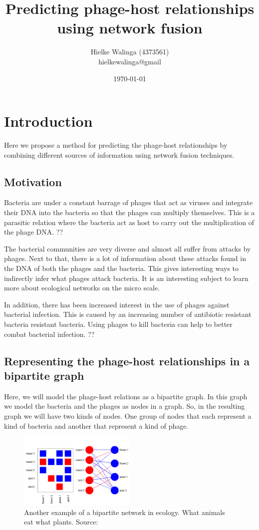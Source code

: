 \documentclass{article}
\title{Predicting phage-host relationships using network fusion}
\author{Hielke Walinga (4373561) \\ hielkewalinga@gmail}
\date{\today}
\begin{document}
\maketitle

\section{Introduction}

Here we propose a method for predicting the phage-host relationships 
by combining different sources of information using network fusion techniques.

\subsection{Motivation}

Bacteria are under a constant barrage of phages that act as viruses and
integrate their DNA into the bacteria so that the phages can multiply themselves.
This is a parasitic relation where the bacteria act as host to carry out the
multiplication of the phage DNA. ??

The bacterial communities are very diverse and almost all suffer from
attacks by phages. Next to that, there is a lot of information about
these attacks found in the DNA of both the phages and the bacteria. 
This gives interesting ways to indirectly infer what phages attack bacteria.
It is an interesting subject to learn more about ecological 
networks on the micro scale.

In addition, there has been increased interest in the use of phages against
bacterial infection. This is caused by an increasing number 
of antibiotic resistant bacteria resistant bacteria. Using phages to 
kill bacteria can help to better combat bacterial infection. ??

\subsection{Representing the phage-host relationships in a bipartite graph}

Here, we will model the phage-host relations as a bipartite graph. In this 
graph we model the bacteria and the phages as nodes in a graph. 
So, in the resulting graph we will have two kinds of nodes. One group 
of nodes that each represent a kind of bacteria and another that represent
a kind of phage.

\begin{figure}[ht]
    \centering
    \includegraphics[width=0.5\textwidth]{img/bipartite_class_01.png}
    \caption{Another example of a bipartite network in ecology. What animals eat what plants. Source:~\cite{flores2016bimat}}
\end{figure}
\end{document}
